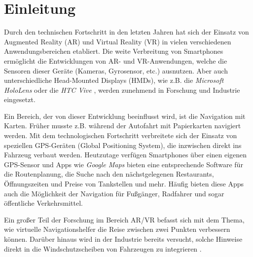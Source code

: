 \chapter{Einleitung}
\label{chap:einleitung}
Durch den technischen Fortschritt in den letzten Jahren hat sich der Einsatz von Augmented Reality (AR) und Virtual Reality (VR) in vielen verschiedenen Anwendungsbereichen etabliert.
Die weite Verbreitung von Smartphones ermöglicht die Entwicklungen von AR- und VR-Anwendungen, welche die Sensoren dieser Geräte (Kameras, Gyrosensor, etc.) ausnutzen.
Aber auch unterschiedliche Head-Mounted Displays (HMDs), wie z.B. die \emph{Microsoft HoloLens} \parencite{Microsoft2018} oder die \emph{HTC Vive} \parencite{HTCCorporation2018}, werden zunehmend in Forschung und Industrie eingesetzt.

Ein Bereich, der von dieser Entwicklung beeinflusst wird, ist die Navigation mit Karten.
Früher musste z.B. während der Autofahrt mit Papierkarten navigiert werden.
Mit dem technologischen Fortschritt verbreitete sich der Einsatz von speziellen GPS-Geräten (Global Positioning System), die inzwischen direkt ins Fahrzeug verbaut werden.
Heutzutage verfügen Smartphones über einen eigenen GPS-Sensor und Apps wie \emph{Google Maps} \parencite{GoogleLLC2018} bieten eine entsprechende Software für die Routenplanung, die Suche nach den nächstgelegenen Restaurants, Öffnungszeiten und Preise von Tankstellen und mehr.
Häufig bieten diese Apps auch die Möglichkeit der Navigation für Fußgänger, Radfahrer und sogar öffentliche Verkehrsmittel.

Ein großer Teil der Forschung im Bereich AR/VR befasst sich mit dem Thema, wie virtuelle Navigationshelfer die Reise zwischen zwei Punkten verbessern können.
Darüber hinaus wird in der Industrie bereits versucht, solche Hinweise direkt in die Windschutzscheiben von Fahrzeugen zu integrieren \parencites{Cunningham2017}{Sygic2018}.

